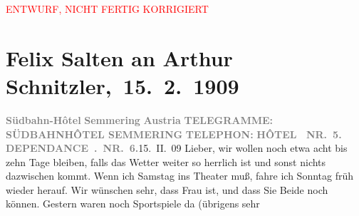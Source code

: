 
\begin{center}
            \textcolor{red}{ENTWURF, NICHT FERTIG KORRIGIERT}
                      \end{center}
            
         
         \renewcommand{\erwaehntePersonen}{Personen: Ottilie Salten, Olga Schnitzler}
         \renewcommand{\erwaehnteOrte}{Orte: Semmering, Südbahnhotel, Wien, Österreich}
         \renewcommand{\erwaehnteWerke}{}
               \section[ Felix Salten an Arthur Schnitzler, 15. 2. 1909]{ Felix Salten an Arthur Schnitzler, 15. 2. 1909}\nopagebreak{}\rehead{ }\begin{ledgroupsized}[t]{13cm}\normalsize\beginnumbering \toendnotes[C]{\smallbreak\pagebreak[2]} 
\toendnotes[C]{\smallbreak}\pstart
           \noindent{}{\pb}\textcolor{gray}{\textbf{Südbahn-Hôtel}}\pend
           \pstart
           \textcolor{gray}{\textbf{Semmering}}\pend
           \pstart
           \textcolor{gray}{\textbf{Austria}}\pend
           \pstart
           \textcolor{gray}{\textbf{\textsc{TELEGRAMME:}}}\pend
           \pstart
           \textcolor{gray}{\textbf{\textsc{SÜDBAHNHÔTEL SEMMERING}}}\pend
           \pstart
           \textcolor{gray}{\textbf{\textsc{TELEPHON:}}}\pend
           \pstart
           \textcolor{gray}{\textbf{\textsc{HÔTEL {\dotsfour} NR. 5.}}}\pend
           \pstart
           \textcolor{gray}{\textbf{\textsc{DEPENDANCE . NR. 6.}}}\hfill 15. II. 09\pend
           \pstart
           Lieber, wir wollen noch etwa acht bis zehn Tage bleiben, falls das
               Wetter weiter so herrlich ist und sonst nichts dazwischen kommt. Wenn ich Samstag ins Theater muß, fahre ich Sonntag früh wieder herauf. Wir wünschen sehr, dass Frau
                  \label{K_L03522-1v}\label{K_L03522-1h} ist, und dass Sie Beide noch \label{K_L03522-2v}\label{K_L03522-2h} können. Gestern waren noch Sportspiele da (übrigens sehr

\end{ledgroupsized}
